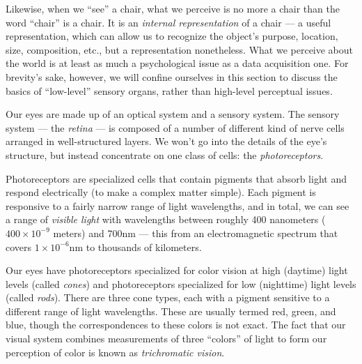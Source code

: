 Likewise, when we ``see'' a chair, what we perceive is no more a chair
than the word ``chair'' is a chair. It is an \emph{internal
representation} of a chair --- a useful representation, which can
allow us to recognize the object's purpose, location, size,
composition, etc., but a representation nonetheless. What we perceive
about the world is at least as much a psychological issue as a data
acquisition one. For brevity's sake, however, we will confine ourselves in
this section to discuss the basics of ``low-level'' sensory organs,
rather than high-level perceptual issues.

Our eyes are made up of an optical system and a sensory system.  The
sensory system --- the \emph{retina} --- is composed of a number of
different kind of nerve cells arranged in well-structured layers. We
won't go into the details of the eye's structure, but instead
concentrate on one class of cells: the \emph{photoreceptors}.

Photoreceptors are specialized cells that contain pigments that absorb
light and respond electrically (to make a complex matter simple).
Each pigment is responsive to a fairly narrow range of light
wavelengths, and in total, we can see a range of \emph{visible light}
with wavelengths between roughly 400 nanometers ($400 \times 10^{-9}$
meters) and 700nm --- this from an electromagnetic spectrum that covers
$1 \times 10^{-6}$nm to thousands of kilometers.

Our eyes have photoreceptors specialized for color vision at high
(daytime) light levels (called \emph{cones}) and photoreceptors
specialized for low (nighttime) light levels (called \emph{rods}).
There are three cone types, each with a pigment sensitive to a
different range of light wavelengths.  These are usually termed red,
green, and blue, though the correspondences to these colors is not
exact. The fact that our visual system combines measurements of three
``colors'' of light to form our perception of color is known as
\emph{trichromatic vision}.

